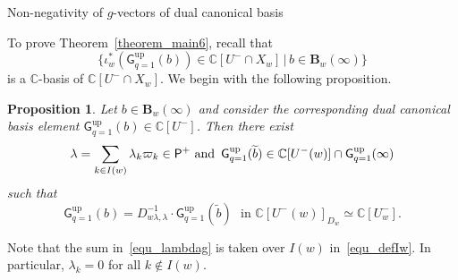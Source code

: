 \documentclass[11pt]{amsart}
\makeatletter
\def\subsection{\@startsection{subsection}{2}%
  \z@{-.8\linespacing\@plus-.3\linespacing}{.3\linespacing\@plus.2\linespacing}%
  {\normalfont\bfseries}}
\newcommand{\C}{\mathbb{C}}
\numberwithin{equation}{section}
\theoremstyle{plain}
\newtheorem{proposition}[theorem]{Proposition}
\theoremstyle{definition}
\numberwithin{equation}{section}
\makeatother
\begin{document}
\subsection{Non-negativity of $g$-vectors of dual canonical basis}

To prove Theorem~\ref{theorem_main6}, recall that
$$
\{\iota_w^* (\mathsf{G}^{\mathrm{up}}_{q=1}(b)) \in \C[U^-\cap X_w] \, \vert \, b \in  \mathbf B_w(\infty)\}  
$$
is a $\C$-basis of $\C[U^-\cap X_w]$. We begin with the following proposition.

\begin{proposition}\label{thm_dualcanonical}
Let $b \in \mathbf{B}_w(\infty)$ and consider the corresponding dual canonical basis element $\mathsf{G}^{\mathrm{up}}_{q=1}(b) \in \C[U^-]$. Then there exist
\begin{equation}\label{equ_lambdag}
\lambda = \sum_{k \in I(w)} \lambda_k \varpi_k \in \mathsf{P}^+ \mbox{ and  \,} \mathsf{G}^{\mathrm{up}}_{q=1}(\widetilde{b}) \in \C[U^{-}(w)]\cap \mathsf{G}^{\mathrm{up}}_{q=1}(\infty)
\end{equation}
such that 
\begin{equation}\label{equ_choicemu}
\mathsf{G}^{\mathrm{up}}_{q=1}(b) = D_{w \lambda, \lambda}^{-1} \cdot \mathsf{G}^{\mathrm{up}}_{q=1}(\widetilde{b})  \,\, \mbox{ in $\C[U^-(w)]_{D_w}\simeq \C[U^-_w]$.}
\end{equation}
\end{proposition}

Note that the sum in~\eqref{equ_lambdag} is taken over $I(w)$ in~\eqref{equ_defIw}. In particular, $\lambda_k = 0$ for all $k \notin I(w)$.
\end{document}
